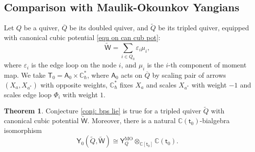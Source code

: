 \documentclass[10pt]{amsart}
\theoremstyle{definition}
\newtheorem{Theorem}{Theorem}[section]
\numberwithin{equation}{section}
\newcommand{\bC}{\mathbb{C}}
\newcommand{\sA}{\mathsf{A}}
\newcommand{\sT}{\mathsf{T}}
\newcommand{\sW}{\mathsf{W}}
\begin{document}


\subsection{Comparison with Maulik-Okounkov Yangians}\label{sec compare MO Yangian}

Let $Q$ be a quiver, $\overline{Q}$ be its doubled quiver, and $\widetilde{Q}$ be its tripled quiver, equipped with canonical cubic potential \eqref{equ on can cub pot}:
$$\widetilde{\sW}=\sum_{i\in Q_0}\varepsilon_i\mu_i, $$ 
where $\varepsilon_i$ is the edge loop on the node $i$, and $\mu_i$ is the $i$-th component of moment map. We take $\sT_0=\sA_0\times \bC^*_{\hbar}$, where $\sA_0$ acts on $\overline{Q}$ by scaling pair of arrows $(X_a,X_{a^*})$ with opposite weights, $\bC^*_{\hbar}$ fixes $X_a$ and scales $X_{a^*}$ with weight $-1$ and scales edge loop $\Phi_i$ with weight $1$.


\begin{Theorem}\label{thm compare with MO yangian}
Conjecture \ref{conj: bps lie} is true for a tripled quiver $\widetilde{Q}$ with canonical cubic potential $\widetilde{\sW}$. Moreover, there is a natural $\bC(\mathsf t_0)$-bialgebra isomorphism $$\mathsf Y_0(\widetilde{Q},\widetilde{\sW})\cong \mathsf Y^{\mathrm{MO}}_Q\otimes_{\bC[\mathsf t_0]}\bC(\mathsf t_0).$$
\end{Theorem}
\end{document}
